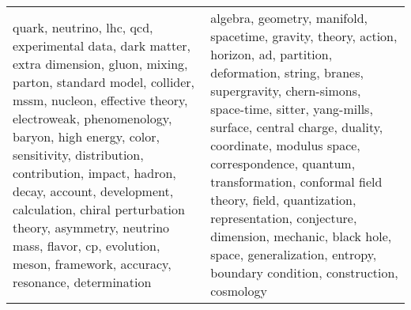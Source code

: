 \begin{longtable}{p{7cm}|p{7cm}}
\bottomrule
\endlastfoot
quark, neutrino, lhc, qcd, experimental data, dark matter, extra dimension, gluon, mixing, parton, standard model, collider, mssm, nucleon, effective theory, electroweak, phenomenology, baryon, high energy, color, sensitivity, distribution, contribution, impact, hadron, decay, account, development, calculation, chiral perturbation theory, asymmetry, neutrino mass, flavor, cp, evolution, meson, framework, accuracy, resonance, determination & algebra, geometry, manifold, spacetime, gravity, theory, action, horizon, ad, partition, deformation, string, branes, supergravity, chern-simons, space-time, sitter, yang-mills, surface, central charge, duality, coordinate, modulus space, correspondence, quantum, transformation, conformal field theory, field, quantization, representation, conjecture, dimension, mechanic, black hole, space, generalization, entropy, boundary condition, construction, cosmology \\
\end{longtable}
